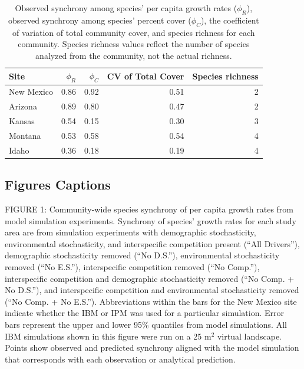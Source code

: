 \documentclass[12pt,]{article}
\begin{document}
\normalsize

\pagebreak{}

\begin{table}[ht]
\centering
\caption{Observed synchrony among species' per capita growth rates ($\phi_{R}$), observed synchrony among species' percent cover ($\phi_{C}$), the coefficient of variation of total community cover, and species richness for each community. Species richness values reflect the number of species analyzed from the community, not the actual richness.} 
{\normalsize
\begin{tabular}{lrrrr}
  \hline
Site & $\phi_{R}$ & $\phi_{C}$ & CV of Total Cover & Species richness \\ 
  \hline
New Mexico & 0.86 & 0.92 & 0.51 &   2 \\ 
  Arizona & 0.89 & 0.80 & 0.47 &   2 \\ 
  Kansas & 0.54 & 0.15 & 0.30 &   3 \\ 
  Montana & 0.53 & 0.58 & 0.54 &   4 \\ 
  Idaho & 0.36 & 0.18 & 0.19 &   4 \\ 
   \hline
\end{tabular}
}
\end{table}

\pagebreak{}


\subsection{Figures Captions}
\doublespacing

FIGURE 1: Community-wide species synchrony of per capita growth rates from model simulation experiments. Synchrony of species' growth rates for each study area are from simulation experiments with demographic stochasticity, environmental stochasticity, and interspecific competition present (``All Drivers''), demographic stochasticity removed (``No D.S.''), environmental stochasticity removed (``No E.S.''), interspecific competition removed (``No Comp.''), interspecific competition and demographic stochasticity removed (``No Comp. + No D.S.''), and interspecific competition and environmental stochasticity removed (``No Comp. + No E.S.''). Abbreviations within the bars for the New Mexico site indicate whether the IBM or IPM was used for a particular simulation. Error bars represent the upper and lower 95\% quantiles from model simulations. All IBM simulations shown in this figure were run on a 25 $\text{m}^2$ virtual landscape. Points show observed and predicted synchrony aligned with the model simulation that corresponds with each observation or analytical prediction.
\end{document}

